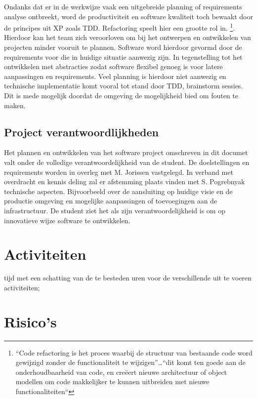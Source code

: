     Ondanks dat er in de werkwijze vaak een uitgebreide planning of requirements analyse ontbreekt, word de productiviteit en software kwaliteit toch bewaakt door de principes uit XP zoals TDD. Refactoring speelt hier een grootte rol in.\parencite{refactoring-ruby}
    \footnote{“Code refactoring is het proces waarbij de structuur van bestaande code word gewijzigd zonder de functionaliteit te wijzigen”…“dit komt ten goede aan de onderhoudbaarheid van code, en creëert nieuwe architectuur of object modellen om code makkelijker te kunnen uitbreiden met nieuwe functionaliteiten“}.
    Hierdoor kan het team zich veroorloven om bij het ontwerpen en ontwikkelen van projecten minder vooruit te plannen. Software word hierdoor gevormd door de requirements voor die in huidige situatie aanwezig zijn. In tegenstelling tot het ontwikkelen met abstracties zodat software flexibel genoeg is voor latere aanpassingen en requirements. Veel planning is hierdoor niet aanwezig en technische implementatie komt vooral tot stand door TDD, brainstorm sessies. Dit is mede mogelijk doordat de omgeving de mogelijkheid bied om fouten te maken.

    \subsection{Project verantwoordlijkheden}

    Het plannen en ontwikkelen van het software project omschreven in dit documet valt onder de volledige verantwoordelijkheid van de student. De doelstellingen en requirements worden in overleg met M. Jorissen vastgelegd. In verband met overdracht en kennis deling zal er afstemming plaats vinden met S. Pogrebnyak technische aspecten. Bijvoorbeeld over de aansluiting op huidige visie en de productie omgeving en mogelijke aanpassingen of toevoegingen aan de infrastructuur.
    De student ziet het als zijn verantwoordelijkheid is om op innovatieve wijze software te ontwikkelen.


\section{Activiteiten} %
tijd met een schatting van de te besteden uren voor de verschillende uit te voeren activiteiten;

\section{Risico's} %

